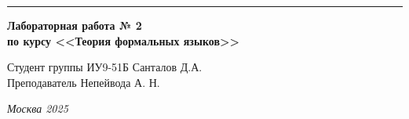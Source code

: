 \documentclass[a4paper, 14pt]{extarticle}
\begin{document}
\begin{titlepage}
\vspace*{-16pt}
\hspace{30pt}\rule{0.866\textwidth}{0.4pt}
  
\vspace{11em}

\begin{center}
\Large {\bf Лабораторная работа № 2} \\ 
\large {\bf по курсу <<Теория формальных языков>>} \\
\end{center}\normalsize

\vspace{8em}


\begin{flushright}
  {Студент группы ИУ9-51Б Санталов Д.А. \hspace*{15pt}\\ 
  \vspace{2ex}
  Преподаватель Непейвода А. Н.\hspace*{15pt}}
\end{flushright}

\bigskip

\vfill
 

\begin{center}
\textsl{Москва 2025}
\end{center}
\end{titlepage}

\renewcommand{\ttdefault}{pcr}

\setlength{\tabcolsep}{3pt}
\newpage
\setcounter{page}{2}

\tableofcontents
\newpage
\end{document}
